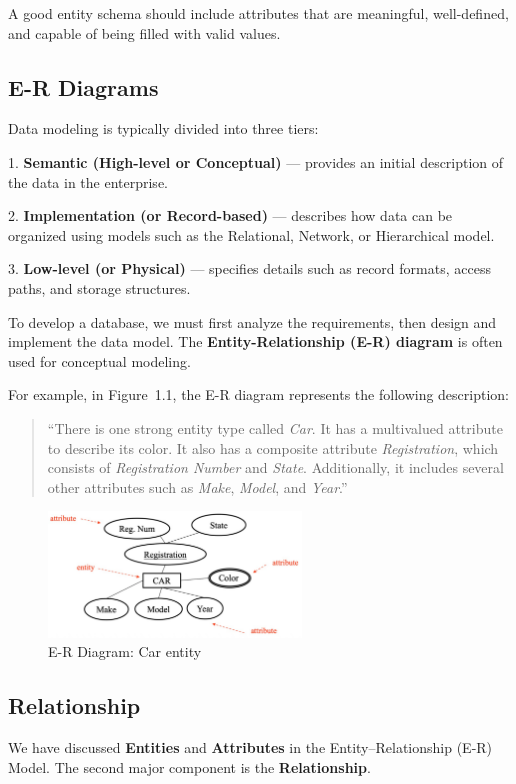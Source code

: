 A good entity schema should include attributes that are meaningful, well-defined, and capable of being filled with valid values.

\subsection{E-R Diagrams}
Data modeling is typically divided into three tiers:  

1. \textbf{Semantic (High-level or Conceptual)} — provides an initial description of the data in the enterprise.  

2. \textbf{Implementation (or Record-based)} — describes how data can be organized using models such as the Relational, Network, or Hierarchical model.  

3. \textbf{Low-level (or Physical)} — specifies details such as record formats, access paths, and storage structures.  

To develop a database, we must first analyze the requirements, then design and implement the data model. The \textbf{Entity-Relationship (E-R) diagram} is often used for conceptual modeling.

For example, in Figure~1.1, the E-R diagram represents the following description:

\begin{quote}
“There is one strong entity type called \emph{Car}. It has a multivalued attribute to describe its color. It also has a composite attribute \emph{Registration}, which consists of \emph{Registration Number} and \emph{State}. Additionally, it includes several other attributes such as \emph{Make}, \emph{Model}, and \emph{Year}.”
\end{quote}

\begin{figure}[H]
  \centering
  \includegraphics[width=0.6\textwidth]{Figure/ER1.pdf}
  \caption{E-R Diagram: Car entity}
\end{figure}

\subsection{Relationship}
We have discussed \textbf{Entities} and \textbf{Attributes} in the Entity–Relationship (E-R) Model. The second major component is the \textbf{Relationship}.  

